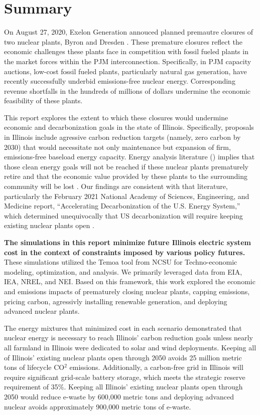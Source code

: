 \section{Summary}
On August 27, 2020, Exelon Generation annouced planned premautre closures of two nuclear plants, 
Byron and Dresden \cite{larson_exelon_2020}. These premature closures reflect 
the economic challenges these plants face in competition with fossil fueled 
plants in the market forces within the PJM interconnection. Specifically, in PJM capacity 
auctions,  low-cost fossil fueled plants, particularly natural gas generation, 
have recently successfully underbid emissions-free nuclear energy. 
Corresponding revenue shortfalls in the hundreds of millions of dollars
undermine the economic feasibility of these plants. 

This report explores the extent to which these closures would undermine 
economic and decarbonization goals in the state of Illinois.  Specifically, 
proposals in Illinois include agressive carbon reduction targets (namely, zero carbon by 2030) 
that would necessitate not only maintenance but expansion of firm, 
emissions-free baseload energy capacity. Energy analysis literature 
(\cite{national_accelerating_2021,others}) implies that those clean energy 
goals will not be reached if these nuclear plants prematurely retire and that 
the economic value provided by these plants to the surrounding community will 
be lost \cite{economic_impact_studies}. 
Our findings are consistent with that literature, particularly the February 
2021 National Academy of Sciences, Engineering, and Medicine report, 
``Accelerating Decarbonization of the U.S. Energy System,'' which determined 
unequivocally that US decarbonization will require keeping existing nuclear 
plants open \cite{national_accelerating_2021}.

\textbf{The simulations in this report minimize future Illinois electric system cost 
in the context of constraints imposed by various policy futures.} These simulations utilized the 
Temoa tool from \gls{NCSU} for Techno-economic modeling, optimization, and 
analysis. We primarily leveraged data from \gls{EIA}, \gls{IEA}, 
\gls{NREL}, and \gls{NEI}. Based on this framework, this work explored the economic 
and emissions impacts of prematurely closing nuclear plants, capping 
emissions, pricing carbon, agressivly installing renewable generation, and deploying advanced nuclear plants.

The energy mixtures that minimized cost in each scenario demonstrated that nuclear energy is necessary to 
reach Illinois' carbon reduction goals unless nearly all farmland in 
Illinois were dedicated to solar and wind deployments. 
Keeping all of Illinois' existing nuclear plants open through 2050 avoids 25 
million metric tons of lifecycle CO$^2$ emissions. 
Additionally, a carbon-free grid in Illinois will require significant 
grid-scale battery storage,  which meets the strategic reserve requirement of 35\%.
Keeping all Illinois' existing nuclear plants open through 2050 would reduce 
e-waste by 600,000 metric tons and deploying advanced nuclear avoids 
approximately 900,000 metric tons of e-waste. 

